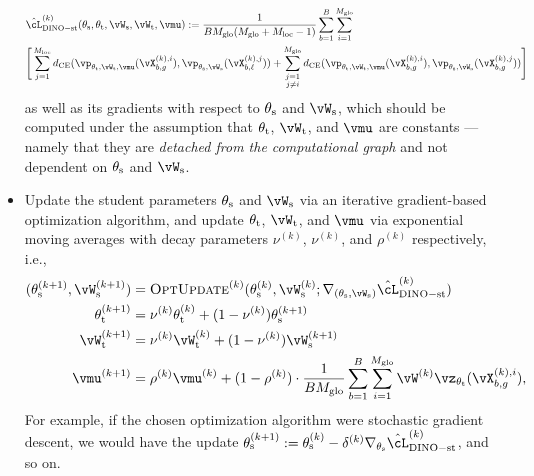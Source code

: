 \documentclass[../../book-main.tex]{subfiles}
\begin{document}
\begin{itemize}
    \begin{align}\label{eq:dino_loss_teacherstudent_empirical}
        &\hat{\cL}_{\dino{}-\student\teacher}^{(k)}(\theta_{\student}, \theta_{\teacher}, \vW_{\student}, \vW_{\teacher}, \vmu) :=
        \frac{1}{BM_{\glo}(M_{\glo} + M_{\loc} - 1)}\sum_{b = 1}^{B}\sum_{i = 1}^{M_{\glo}}\\
        &\Bigg[\sum_{j = 1}^{M_{\loc}}d_{\CE}(\vp_{\theta_{\teacher}, \vW_{\teacher}, \vmu}(\vX_{b, g}^{(k), i}), \vp_{\theta_{\student}, \vW_{\student}}(\vX_{b, \ell}^{(k), j})) + \sum_{\substack{j = 1 \\ j \neq i}}^{M_{\glo}}d_{\CE}(\vp_{\theta_{\teacher}, \vW_{\teacher}, \vmu}(\vX_{b, g}^{(k), i}), \vp_{\theta_{\student}, \vW_{\student}}(\vX_{b, g}^{(k), j}))\Bigg]\nonumber
    \end{align}
    as well as its gradients with respect to \(\theta_{\mathrm{s}}\) and \(\vW_{\student}\), which should be computed under the assumption that \(\theta_{\mathrm{t}}\), \(\vW_{\teacher}\), and \(\vmu\) are constants --- namely that they are \textit{detached from the computational graph} and not dependent on \(\theta_{\mathrm{s}}\) and \(\vW_{\student}\).
    \item Update the student parameters \(\theta_{\mathrm{s}}\) and \(\vW_{\student}\) via an iterative gradient-based optimization algorithm, and update \(\theta_{\mathrm{t}}\), \(\vW_{\teacher}\), and \(\vmu\) via exponential moving averages with decay parameters \(\nu^{(k)}\), \(\nu^{(k)}\), and \(\rho^{(k)}\) respectively, i.e., 
    \begin{align}
        (\theta_{\student}^{(k + 1)}, \vW_{\student}^{(k + 1)})
        &= \textsc{OptUpdate}^{(k)}(\theta_{\student}^{(k)}, \vW_{\student}^{(k)}; \nabla_{(\theta_{\student}, \vW_{\student})}\hat{\cL}_{\dino-\student\teacher}^{(k)}) \\
        \theta_{\teacher}^{(k + 1)}
        &= \nu^{(k)}\theta_{\teacher}^{(k)} + (1 - \nu^{(k)})\theta_{\student}^{(k + 1)} \\
        \vW_{\teacher}^{(k + 1)}
        &= \nu^{(k)}\vW_{\teacher}^{(k)} + (1 - \nu^{(k)})\vW_{\student}^{(k + 1)} \\
        \vmu^{(k + 1)}
        &= \rho^{(k)}\vmu^{(k)} + (1 - \rho^{(k)})\cdot\frac{1}{BM_{\glo}}\sum_{b = 1}^{B}\sum_{i = 1}^{M_{\glo}}\vW^{(k)}\vz_{\theta_{\teacher}}(\vX_{b, g}^{(k), i}),
    \end{align}
    For example, if the chosen optimization algorithm were stochastic gradient descent, we would have the update \(\theta_{\student}^{(k + 1)} := \theta_{\student}^{(k)} - \delta^{(k)}\nabla_{\theta_{\student}}\hat{\cL}_{\dino{}-\student\teacher}^{(k)}\), and so on.
\end{itemize}
\end{document}
